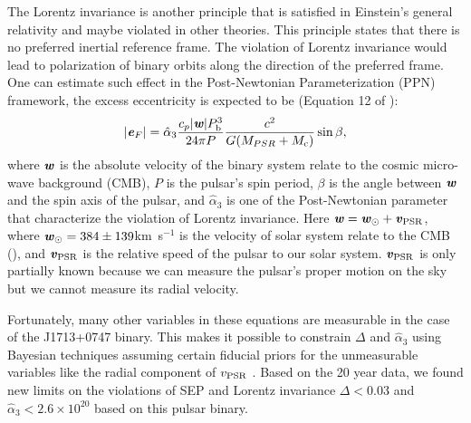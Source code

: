The Lorentz invariance is another principle that is satisfied in Einstein's
general relativity and maybe violated in other theories. This principle
states that there is no preferred inertial reference frame. The violation of
Lorentz invariance would lead to polarization of binary orbits along the
direction of the preferred frame.
One can estimate such effect in the Post-Newtonian Parameterization
(PPN) framework, the excess eccentricity is expected to be (Equation 12 of
\citealt{sns+05}):
\begin{equation}
|\textbf{\textit{e}}_F| = \hat{\alpha}_3 \frac{c_p|\textbf{\textit{w}}|P_{\rm b}^3}{24\pi P}
\frac{c^2}{G (M_{PSR}+M_{\rm c})}\sin \beta,
\end{equation}
where $\textbf{\textit{w}}$ is the absolute velocity of the binary system
relate to the cosmic micro-wave background (CMB), $P$ is the pulsar's spin period, $\beta$ is the
angle between $\textbf{\textit{w}}$ and the spin axis of the pulsar, and
$\hat{\alpha}_3$ is one of the Post-Newtonian parameter that characterize the
violation of Lorentz invariance. 
Here $\textbf{\textit{w}} = \textbf{\textit{w}}_{\odot} + \textbf{\textit{v}}_{\rm PSR}$, where
$\textbf{\textit{w}}_{\odot}=384\pm139$km~s$^{-1}$ is the velocity of solar system relate to the CMB (\citealt{aaa+13}),
and $\textbf{\textit{v}}_{\rm PSR}$ is the relative speed of the pulsar to our solar system. $\textbf{\textit{v}}_{\rm PSR}$ is only partially known because we can measure the pulsar's
proper motion on the sky but we cannot measure its radial velocity.

Fortunately, many other variables in these equations are measurable in the
case of the J1713+0747 binary. This makes it possible to constrain $\Delta$
and $\hat{\alpha}_3$ using Bayesian techniques assuming certain fiducial
priors for the unmeasurable variables like the radial component of
$v_{\rm PSR}$ \citep{sns+05, sfl+05, gsf+11}. Based on the 20 year 
data, we found new
limits on the violations of SEP and Lorentz invariance $\Delta < 0.03$ and
$\hat{\alpha}_3<2.6\times10^{20}$ based on this pulsar binary.


